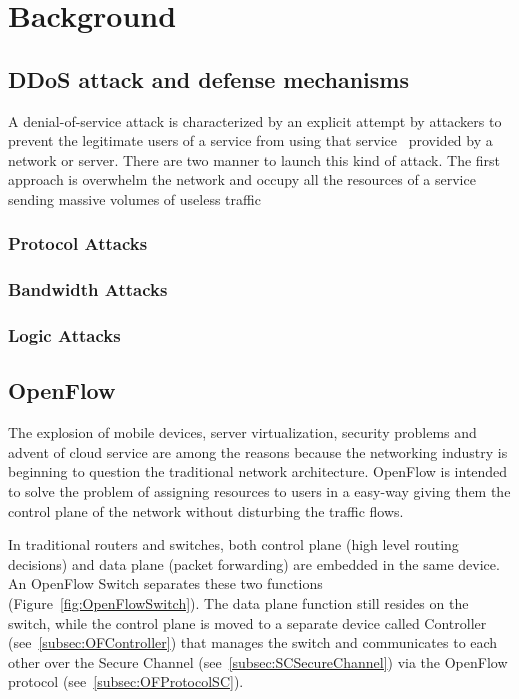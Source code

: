 \chapter{Background}
\label{chapter:background} 



\section{DDoS attack and defense mechanisms}
\label{sec:BGDDoS}

A denial-of-service attack is characterized by an explicit attempt by attackers to prevent the legitimate users of a service from using that service~\cite{dosCert} provided by a network or server. There are two manner to launch this kind of attack. The first approach is overwhelm the network and occupy all the resources of a service sending massive volumes of useless traffic

\subsection{Protocol Attacks}



\subsection{Bandwidth Attacks}

\subsection{Logic Attacks}

\section{OpenFlow}
\label{sec:BGOpenFlow}

The explosion of mobile devices, server virtualization, security problems and advent of cloud service are among the reasons because the networking industry is beginning to question the traditional network architecture. OpenFlow is intended to solve the problem of assigning resources to users in a easy-way giving them the control plane of the network without disturbing the traffic flows. 

\par 

In traditional routers and switches, both control plane (high level routing decisions) and data plane (packet forwarding) are embedded in the same device. An OpenFlow Switch separates these two functions (Figure~\ref{fig:OpenFlowSwitch}). The data plane function still resides on the switch, while the control plane is moved to a separate device called Controller (see~\ref{subsec:OFController}) that manages the switch and communicates to each other over the Secure Channel (see~\ref{subsec:SCSecureChannel}) via the OpenFlow protocol (see~\ref{subsec:OFProtocolSC}).

